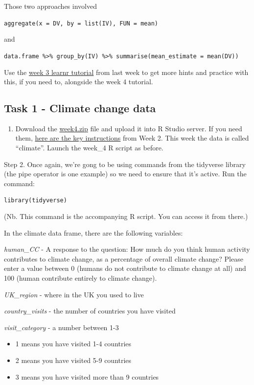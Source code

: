 \documentclass[
]{book}
\providecommand{\tightlist}{%
  \setlength{\itemsep}{0pt}\setlength{\parskip}{0pt}}
\begin{document}
Those two approaches involved

\texttt{aggregate(x\ =\ DV,\ by\ =\ list(IV),\ FUN\ =\ mean)}

and

\texttt{data.frame\ \%\textgreater{}\%\ group\_by(IV)\ \%\textgreater{}\%\ summarise(mean\_estimate\ =\ mean(DV))}

Use the \href{https://ma-rconnect.lancs.ac.uk/W3_LabPrep/}{week 3 learnr tutorial} from last week to get more hints and practice with this, if you need to, alongside the week 4 tutorial.

\hypertarget{task-1---climate-change-data}{%
\subsection{Task 1 - Climate change data}\label{task-1---climate-change-data}}

\begin{enumerate}
\def\labelenumi{\arabic{enumi}.}
\tightlist
\item
  Download the \href{files/Week_4/Week_4.zip}{week4.zip} file and upload it into R Studio server. If you need them, \protect\hyperlink{uploading_zip}{here are the key instructions} from Week 2. This week the data is called ``climate''. Launch the week\_4 R script as before.
\end{enumerate}

Step 2. Once again, we're gong to be using commands from the tidyverse library (the pipe operator is one example) so we need to ensure that it's active. Run the command:

\texttt{library(tidyverse)}

(Nb. This command is the accompanying R script. You can access it from there.)

In the climate data frame, there are the following variables:

\emph{human\_CC} - A response to the question: How much do you think human activity contributes to climate change, as a percentage of overall climate change? Please enter a value between 0 (humans do not contribute to climate change at all) and 100 (human contribute entirely to climate change).

\emph{UK\_region} - where in the UK you used to live

\emph{country\_visits} - the number of countries you have visited

\emph{visit\_category} - a number between 1-3

\begin{itemize}
\item
  1 means you have visited 1-4 countries
\item
  2 means you have visited 5-9 countries
\item
  3 means you have visited more than 9 countries
\end{itemize}
\end{document}
